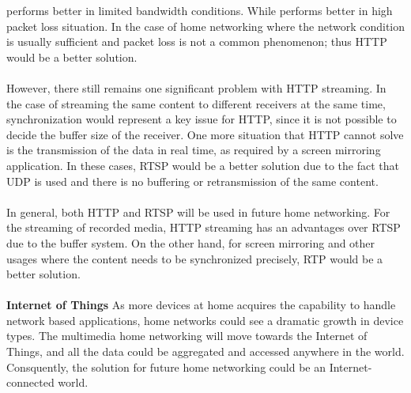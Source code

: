 performs better in limited bandwidth conditions. While performs better in high
packet loss situation. In the case of home networking where the network
condition is usually sufficient and packet loss is not a common phenomenon; thus
HTTP would be a better solution. \\
\\
However, there still remains one significant problem with HTTP streaming. In the
case of streaming the same content to different receivers at the same time,
synchronization would represent a key issue for HTTP, since it is not possible
to decide the buffer size of the receiver. One more situation that HTTP cannot
solve is the transmission of the data in real time, as required by a screen
mirroring application. In these cases, RTSP would be a better solution due to
the fact that UDP is used and there is no buffering or retransmission of the
same content.\\
\\
In general, both HTTP and RTSP will be used in future home networking. For
the streaming of recorded media, HTTP streaming has an advantages over RTSP
due to the buffer system. On the other hand, for screen mirroring and other
usages where the content needs to be synchronized precisely, RTP would be a
better solution.\\
\\
\textbf{Internet of Things}
As more devices at home acquires the capability to handle network based
applications, home networks could see a dramatic growth in device types. The
multimedia home networking will move towards the Internet of Things, and all
the data could be aggregated and accessed anywhere in the world. Consquently,
the solution for future home networking could be an Internet-connected
world.
